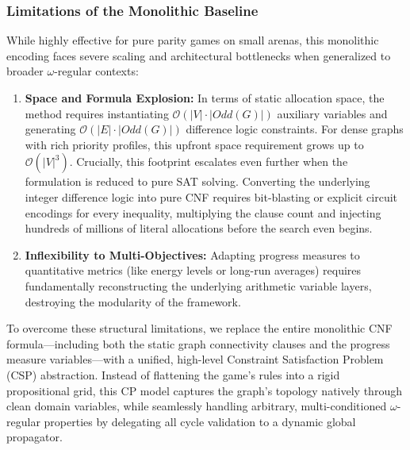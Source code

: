 \documentclass[preprint,12pt,authoryear]{elsarticle}
\begin{document}
\subsubsection{Limitations of the Monolithic Baseline}
While highly effective for pure parity games on small arenas, this monolithic encoding faces severe scaling and architectural bottlenecks when generalized to broader $\omega$-regular contexts:
\begin{enumerate}
     \item \textbf{Space and Formula Explosion:} In terms of static allocation space, the method requires instantiating $\mathcal{O}(|V| \cdot |\textit{Odd}(G)|)$ auxiliary variables and generating $\mathcal{O}(|E| \cdot |\textit{Odd}(G)|)$ difference logic constraints. For dense graphs with rich priority profiles, this upfront space requirement grows up to $\mathcal{O}(|V|^3)$. Crucially, this footprint escalates even further when the formulation is reduced to pure SAT solving. Converting the underlying integer difference logic into pure CNF requires bit-blasting or explicit circuit encodings for every inequality, multiplying the clause count and injecting hundreds of millions of literal allocations before the search even begins.
    \item \textbf{Inflexibility to Multi-Objectives:} Adapting progress measures to quantitative metrics (like energy levels or long-run averages) requires fundamentally reconstructing the underlying arithmetic variable layers, destroying the modularity of the framework.
\end{enumerate}

To overcome these structural limitations, we replace the entire monolithic CNF formula—including both the static graph connectivity clauses and the progress measure variables—with a unified, high-level Constraint Satisfaction Problem (CSP) abstraction. Instead of flattening the game's rules into a rigid propositional grid, this CP model captures the graph's topology natively through clean domain variables, while seamlessly handling arbitrary, multi-conditioned $\omega$-regular properties by delegating all cycle validation to a dynamic global propagator.
\end{document}
